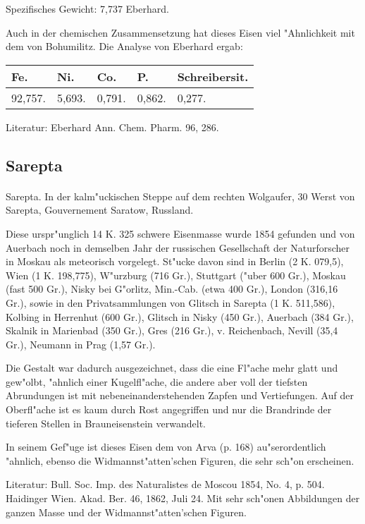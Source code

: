 \documentclass[a4paper, 11pt, oneside]{article}
\begin{document}
Spezifisches Gewicht: 7,737 Eberhard.

Auch in der chemischen Zusammensetzung hat dieses Eisen viel "Ahnlichkeit mit dem von Bohumilitz. Die Analyse von Eberhard ergab:
\begin{table}[H]
    \centering
    \begin{tabular}{l l l l l}
        Fe. & Ni. & Co. & P. & Schreibersit. \\ \hline
        92,757. & 5,693. & 0,791. & 0,862. & 0,277. \\
    \end{tabular}
\end{table}

\footnotesize
Literatur: Eberhard Ann. Chem. Pharm. 96, 286.

\subsection{Sarepta}
\normalsize
\paragraph{}
Sarepta. In der kalm"uckischen Steppe auf dem rechten Wolgaufer, 30 Werst von Sarepta, Gouvernement Saratow, Russland.

Diese urspr"unglich 14 K. 325 schwere Eisenmasse wurde 1854 gefunden und von Auerbach noch in demselben Jahr der russischen Gesellschaft der Naturforscher in Moskau als meteorisch vorgelegt. St"ucke davon sind in Berlin (2 K. 079,5), Wien (1 K. 198,775), W"urzburg (716 Gr.), Stuttgart ("uber 600 Gr.), Moskau (fast 500 Gr.), Nisky bei G"orlitz, Min.-Cab. (etwa 400 Gr.), London (316,16 Gr.), sowie in den Privatsammlungen von Glitsch in Sarepta (1 K. 511,586), Kolbing in Herrenhut (600 Gr.), Glitsch in Nisky (450 Gr.), Auerbach (384 Gr.), Skalnik in Marienbad (350 Gr.), Gres (216 Gr.), v. Reichenbach, Nevill (35,4 Gr.), Neumann in Prag (1,57 Gr.).

Die Gestalt war dadurch ausgezeichnet, dass die eine Fl"ache mehr glatt und gew"olbt, "ahnlich einer Kugelfl"ache, die andere aber voll der tiefsten Abrundungen ist mit nebeneinanderstehenden Zapfen und Vertiefungen. Auf der Oberfl"ache ist es kaum durch Rost angegriffen und nur die Brandrinde der tieferen Stellen in Brauneisenstein verwandelt.

In seinem Gef"uge ist dieses Eisen dem von Arva (p. 168) au"serordentlich "ahnlich, ebenso die Widmannst"atten'schen Figuren, die sehr sch"on erscheinen.

\footnotesize
Literatur: Bull. Soc. Imp. des Naturalistes de Moscou 1854, No. 4, p. 504. Haidinger Wien. Akad. Ber. 46, 1862, Juli 24. Mit sehr sch"onen Abbildungen der ganzen Masse und der Widmannst"atten'schen Figuren.
\end{document}
